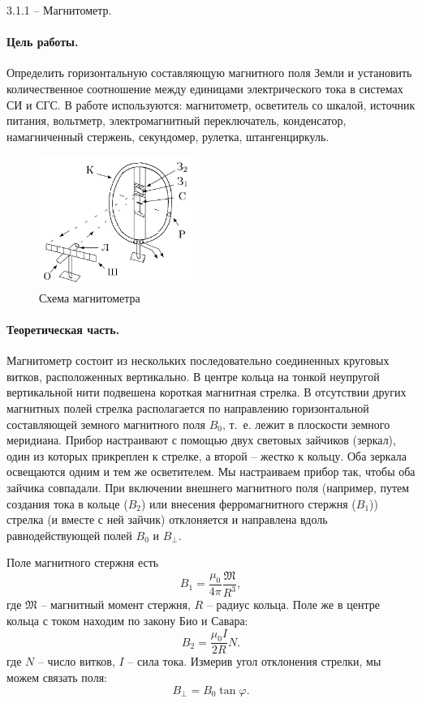 \documentclass{lab_class}
\newcommand{\magm}{\mathfrak{M}}
\begin{document}
{\Large 3.1.1 --  Магнитометр.}

\paragraph{Цель работы.}
Определить горизонтальную составляющую магнитного поля Земли и установить количественное соотношение между единицами электрического тока в системах СИ и СГС.
В работе используются: магнитометр, осветитель со шкалой, источник питания, вольтметр, электромагнитный переключатель, конденсатор, намагниченный стержень, секундомер, рулетка, штангенциркуль.

\begin{figure}
\centering
\includegraphics[width=5cm]{Fig1.png}
\caption{Схема магнитометра}
\end{figure}

\paragraph{Теоретическая часть.}
Магнитометр состоит из нескольких последовательно соединенных круговых витков, расположенных вертикально. В центре кольца на тонкой неупругой вертикальной нити подвешена короткая магнитная стрелка. В отсутствии других магнитных полей стрелка располагается по направлению горизонтальной составляющей земного магнитного поля $B_0$, т.~е. лежит в плоскости земного меридиана. Прибор настраивают с помощью двух световых зайчиков (зеркал), один из которых прикреплен к стрелке, а второй -- жестко к кольцу. Оба зеркала освещаются одним и тем же осветителем. Мы настраиваем прибор так, чтобы оба зайчика совпадали. При включении внешнего магнитного поля (например, путем создания тока в кольце ($B_2$) или внесения ферромагнитного стержня ($B_1$)) стрелка (и вместе с ней зайчик) отклоняется и направлена вдоль равнодействующей полей $B_0$ и $B_{\perp}$. 

Поле магнитного стержня есть
$$
	B_1 = \dfrac{\mu_0}{4\pi} \dfrac{\magm}{R^3},
$$
где $\magm$ -- магнитный момент стержня, $R$ -- радиус кольца. Поле же в центре кольца с током находим по закону Био и Савара:
$$
	B_2 = \dfrac{\mu_0 I}{2R} N.
$$
где $N$ -- число витков, $I$ -- сила тока. Измерив угол отклонения стрелки, мы можем связать поля:
$$
	B_{\perp} = B_0 \tan{\varphi}.
$$
\end{document}
